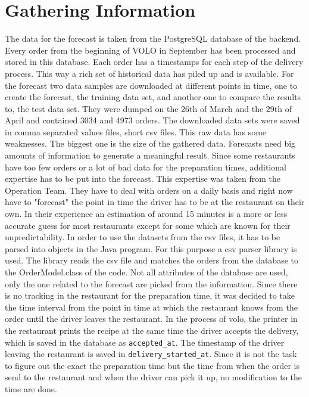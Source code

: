\section{Gathering Information}\label{section:Gathering Information}
The data for the forecast is taken from the PostgreSQL database of the backend. Every order from the beginning of VOLO in September has been processed and stored in this database. Each order has a timestamps for each step of the delivery process. This way a rich set of historical data has piled up and is available. For the forecast two data samples are downloaded at different points in time, one to create the forecast, the training data set, and another one to compare the results to, the test data set. They were dumped on the 26th of March and the 29th of April and contained 3034 and 4973 orders. The downloaded data sets were saved in comma separated values files, short csv files.\newline
This raw data has some weaknesses. The biggest one is the size of the gathered data. Forecasts need big amounts of information to generate a meaningful result. Since some restaurants have too few orders or a lot of bad data for the preparation times, additional expertise has to be put into the forecast. This expertise was taken from the Operation Team. They have to deal with orders on a daily basis and right now have to "forecast" the point in time the driver has to be at the restaurant on their own. In their experience an estimation of around 15 minutes is a more or less accurate guess for most restaurants except for some which are known for their unpredictability.\newline
In order to use the datasets from the csv files, it has to be parsed into objects in the Java program. For this purpose a csv parser library is used. The library reads the csv file and matches the orders from the database to the OrderModel.class of the code. Not all attributes of the database are used, only the one related to the forecast are picked from the information. Since there is no tracking in the restaurant for the preparation time, it was decided to take the time interval from the point in time at which the restaurant knows from the order until the driver leaves the restaurant. In the process of volo, the printer in the restaurant prints the recipe at the same time the driver accepts the delivery, which is saved in the database as \texttt{accepted\_at}. The timestamp of the driver leaving the restaurant is saved in \texttt{delivery\_started\_at}. Since it is not the task to figure out the exact the preparation time but the time from when the order is send to the restaurant and when the driver can pick it up, no modification to the time are done.
